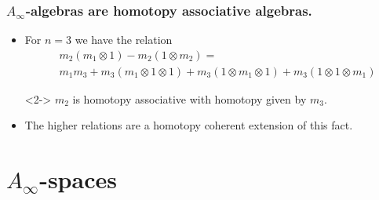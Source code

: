 \documentclass{beamer}
\theoremstyle{definition}
\begin{document}
\begin{frame}
\frametitle{$A_\infty$-algebras are homotopy associative algebras.}
\begin{itemize}
\item<1-> For $n=3$ we have the relation
\begin{align*}
&m_2(m_1\otimes 1)-m_2(1\otimes m_2)=\\ %
&m_1m_3+m_3(m_1\otimes 1\otimes 1)+m_3(1\otimes m_1\otimes 1)+m_3(1\otimes 1\otimes m_1)
\end{align*}
\item[]<2-> $m_2$ is homotopy associative with homotopy given by $m_3$. %
\item<3-> The higher relations are a homotopy coherent extension of this fact. %
\end{itemize}
\end{frame}

\section{$A_\infty$-spaces}
\end{document}
